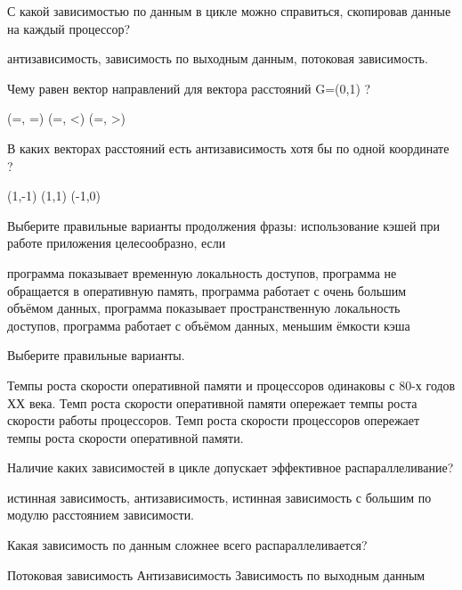 \documentclass[a4paper, 12pt, addpoints]{exam}
\begin{document}
\begin{questions}
\question[1] С какой зависимостью по данным в цикле можно справиться, скопировав данные на каждый процессор?
\begin{choices}
    \correctchoice антизависимость,
    \choice зависимость по выходным данным,
    \choice потоковая зависимость.
\end{choices}

\question[1] Чему равен вектор направлений для вектора расстояний G=(0,1) ?
\begin{choices}
    \choice (=, =)
    \correctchoice (=, <)
    \choice (=, >)
\end{choices}

\question[1] В каких векторах расстояний есть антизависимость хотя бы по одной координате ?
\begin{choices}
    \correctchoice (1,-1)
    \choice (1,1)
    \correctchoice (-1,0)
\end{choices}

\question[1] Выберите правильные варианты продолжения фразы: использование кэшей
при работе приложения целесообразно, если
\begin{choices}
    \correctchoice программа показывает временную локальность доступов,
    \choice программа не обращается в оперативную память,
    \choice программа работает с очень большим объёмом данных,
    \correctchoice программа показывает пространственную локальность доступов,
    \choice программа работает с объёмом данных, меньшим ёмкости кэша
\end{choices}

\question[1] Выберите правильные варианты.
\begin{choices}
    \choice Темпы роста скорости оперативной памяти и процессоров одинаковы с 80-х годов ХХ века.
    \choice Темп роста скорости оперативной памяти опережает темпы роста скорости работы процессоров.
    \correctchoice Темп роста скорости процессоров опережает темпы роста скорости оперативной памяти. 
\end{choices}

\question[1] Наличие каких зависимостей в цикле допускает эффективное распараллеливание?
\begin{choices}
    \choice истинная зависимость,
    \correctchoice антизависимость,
    \correctchoice истинная зависимость с большим по модулю расстоянием зависимости.
\end{choices}

\question[1] Какая зависимость по данным сложнее всего распараллеливается?
\begin{choices}
    \correctchoice Потоковая зависимость
    \choice Антизависимость
    \choice Зависимость по выходным данным
\end{choices}


\end{questions}
\end{document}
